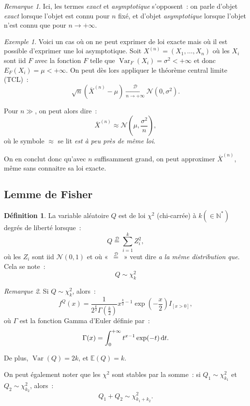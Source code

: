 \documentclass{report}
\DeclareMathOperator{\Var}{Var}
\newcommand{\E}{\mathbb E}
\newcommand{\pinfty}{{+\infty}}
\newcommand{\cvgd}{\xrightarrow[n \to \pinfty]{\mathcal D}}
\newcommand{\distreq}{\overset {\mathcal D}=}
\newcommand{\Nzo}{\mathcal N(0, 1)}
\newcommand{\N}{\mathbb N}
\newcommand{\charfun}[1]{I_{\left[#1\right]}}
\theoremstyle{definition}
\newtheorem{déf}[thm]{Définition}
\theoremstyle{remark}
\newtheorem*{rmq}{Remarque}
\newtheorem{ex}{Exemple}[chapter]
\begin{document}
		\begin{rmq} Ici, les termes \textit{exact} et \textit{asymptotique} s'opposent~: on parle d'objet \textit{exact} lorsque l'objet est connu pour $n$ fixé,
		et d'objet \textit{asymptotique} lorsque l'objet n'est connu que pour $n \to \pinfty$.
		\end{rmq}

		\begin{ex} Voici un cas où on ne peut exprimer de loi exacte mais où il est possible d'exprimer une loi asymptotique. Soit $X^{(n)} = (X_1, \ldots, X_n)$
		où les $X_i$ sont iid $F$ avec la fonction $F$ telle que $\Var_F(X_i) = \sigma^2 < \pinfty$ et donc $E_F(X_i) = \mu < \pinfty$. On peut dès lors
		appliquer le théorème central limite (TCL)~:
		\[\sqrt n(\overline X^{(n)} - \mu) \cvgd \mathcal N(0, \sigma^2).\]

		Pour $n \gg$, on peut alors dire~:
		\[\overline X^{(n)} \approx \mathcal N\left(\mu, \frac {\sigma^2}n\right),\]
		où le symbole $\approx$ se lit \textit{est à peu près de même loi}.

		On en conclut donc qu'avec $n$ suffisamment grand, on peut approximer $\overline X^{(n)}$, même sans connaitre sa loi exacte.
		\end{ex}

	\subsection{Lemme de Fisher}
		\begin{déf} La variable aléatoire $Q$ est de loi $\chi^2$ (chi-carrée) à $k (\in \N^*)$ degrés de liberté lorsque~:
		\[Q \distreq \sum_{i=1}^kZ_i^2,\]
		où les $Z_i$ sont iid $\Nzo$ et où «~$\distreq$~» veut dire \textit{a la même distribution que}. Cela se note~:
		\[Q \sim \chi^2_k\]
		\end{déf}
		\begin{rmq} Si $Q \sim \chi^2_k$, alors~:
		\[f^Q(x) = \frac 1{2^{\frac k2}\Gamma\left(\frac k2\right)}x^{\frac k2-1}\exp\left(-\frac x2\right)\charfun{x > 0},\]
		où $\Gamma$ est la fonction Gamma d'Euler définie par~:
		\[\Gamma(x) = \int_0^\pinfty t^{x-1}\exp(-t)\dif t.\]

		De plus, $\Var(Q) = 2k$, et $\E(Q) = k$.

		On peut également noter que les $\chi^2$ sont stables par la somme~: si $Q_1 \sim \chi^2_{k_1}$ et $Q_2 \sim \chi^2_{k_2}$, alors~:
		\[Q_1 + Q_2 \sim \chi^2_{k_1+k_2}.\]
		\end{rmq}
\end{document}
